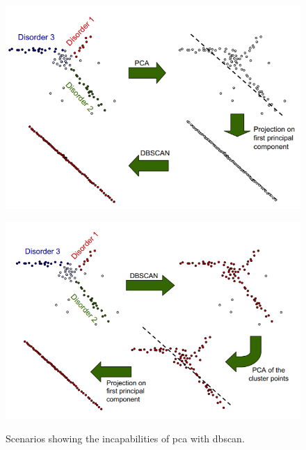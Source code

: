 \begin{figure}
    \centering
    \begin{minipage}[t]{.5\textwidth}
      \centering  
      \captionsetup{width=.9\linewidth}
      \includegraphics[width=.9\textwidth]{figures/pcalocalfeat1.png}
      \label{fig:pca_dbscan}
    \end{minipage}%
    \begin{minipage}[t]{.5\textwidth}
      \centering
      \captionsetup{width=.9\linewidth}
      \includegraphics[width=.9\textwidth]{figures/pcalocalfeat2.png}
      \label{fig:dbscan_pca}
    \end{minipage}
    \caption{Scenarios showing the incapabilities of \acrshort{pca} with \acrshort{dbscan}.}
    \label{fig:localfeatrelevance}
\end{figure}


